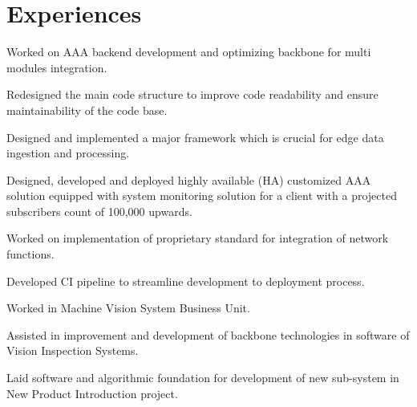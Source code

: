 \documentclass[letterpaper]{deedy-resume} %
\begin{document}
\hfill
%
%
\begin{minipage}[t]{0.66\textwidth} %


\section{Experiences}


\vspace{\topsep} %
\begin{tightitemize}
\item Worked on AAA backend development and optimizing backbone for multi modules integration.
\item Redesigned the main code structure to improve code readability and ensure maintainability of the code base.
\item Designed and implemented a major framework which is crucial for edge data ingestion and processing.
\item Designed, developed and deployed highly available (HA) customized AAA solution equipped with system monitoring solution for a client with a projected subscribers count of 100,000 upwards.
\item Worked on implementation of proprietary standard for integration of network functions.
\item Developed CI pipeline to streamline development to deployment process.
\end{tightitemize}

\sectionspace %


\begin{tightitemize}
\item Worked in Machine Vision System Business Unit.
\item Assisted in improvement and development of backbone technologies in software of Vision Inspection Systems.
\item Laid software and algorithmic foundation for development of new sub-system in New Product Introduction project.
\end{tightitemize}


\end{minipage}
\end{document}
